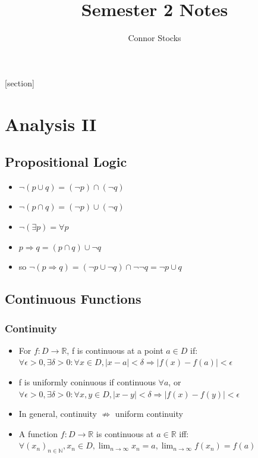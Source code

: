 \documentclass{article}
\title{Semester 2 Notes}
\author{Connor Stocks}
\begin{document}
[section]
\newcommand{\equationref}{\stepcounter{eq}\arabic{section}.\arabic{eq}}
\newcommand{\tagequation}[1]{\[\tag{\equationref}#1\]}

\hypersetup{
    colorlinks,
    citecolor=black,
    filecolor=black,
    linkcolor=black,
    urlcolor=black
}

\maketitle

\newpage
\tableofcontents


\newpage
\section{Analysis II}
\subsection{Propositional Logic}




\begin{itemize}
    \item \(\lnot(p\cup q) = (\lnot p)\cap(\lnot q)\)
    \item \(\lnot(p\cap q) = (\lnot p)\cup(\lnot q)\)
    \item \(\lnot(\exists p) = \forall p\)
    \item \(p \Rightarrow q = (p\cap q)\cup \lnot q\)
    \item so \(\lnot (p\Rightarrow q) = (\lnot p \cup\lnot q)\cap \lnot\lnot q = \lnot p\cup q\)
\end{itemize}

\subsection{Continuous Functions}

\subsubsection*{Continuity}

\begin{itemize}
    \item For \(f: D\rightarrow\mathbb{R}\), f is continuous at a point \(a\in D\) if:
    \\\(\forall\epsilon>0, \exists\delta>0:\forall x\in D, |x-a|<\delta\Rightarrow|f(x)-f(a)|<\epsilon\)
    \item f is uniformly coninuous if continuous \(\forall a\), or
    \\\(\forall\epsilon>0, \exists\delta>0:\forall x, y\in D, |x-y|<\delta\Rightarrow|f(x)-f(y)|<\epsilon\)
    \item In general, continuity \(\not\Rightarrow\) uniform continuity

    \item A function \(f:D\rightarrow\mathbb{R}\) is continuous at \(a\in\mathbb{R}\) iff:
    \\\(\forall(x_n)_{n\in\mathbb{N}}, x_n\in D, \lim_{n\to\infty}{x_n} = a, \lim_{n\to\infty}{f(x_n)}=f(a)\)
\end{itemize}
\end{document}

